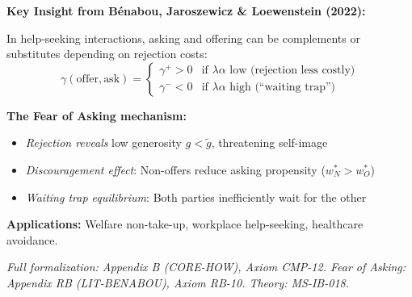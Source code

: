 \begin{tcolorbox}[
    colback=blue!5!white,
    colframe=blue!60!black,
    title={\textbf{Advanced: Asking-Offering Complementarity (Axiom CMP-12)}},
    fonttitle=\bfseries
]
\textbf{Key Insight from Bénabou, Jaroszewicz \& Loewenstein (2022):}

In help-seeking interactions, asking and offering can be complements or substitutes depending on rejection costs:
\begin{equation}
\gamma(\text{offer}, \text{ask}) = \begin{cases}
\gamma^{+} > 0 & \text{if } \lambda\alpha \text{ low (rejection less costly)} \\
\gamma^{-} < 0 & \text{if } \lambda\alpha \text{ high (``waiting trap'')}
\end{cases}
\end{equation}

\textbf{The Fear of Asking mechanism:}
\begin{itemize}[nosep]
    \item \textit{Rejection reveals} low generosity $g < \tilde{g}$, threatening self-image
    \item \textit{Discouragement effect}: Non-offers reduce asking propensity ($w^*_N > w^*_O$)
    \item \textit{Waiting trap equilibrium}: Both parties inefficiently wait for the other
\end{itemize}

\textbf{Applications:} Welfare non-take-up, workplace help-seeking, healthcare avoidance.

\medskip
\textit{Full formalization: Appendix B (CORE-HOW), Axiom CMP-12. Fear of Asking: Appendix RB (LIT-BENABOU), Axiom RB-10. Theory: MS-IB-018.}
\end{tcolorbox}

